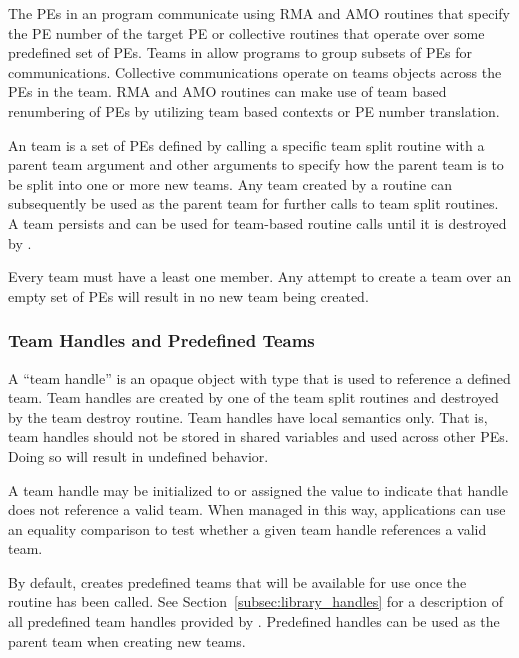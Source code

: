 The \acp{PE} in an \openshmem program communicate using
\ac{RMA} and \ac{AMO} routines that specify the \ac{PE} number of the target
\ac{PE} or collective routines that operate over some predefined
set of \acp{PE}. Teams in \openshmem allow programs to group subsets
of \acp{PE} for communications. Collective communications operate on
teams objects across the \acp{PE} in the team. \ac{RMA} and \ac{AMO} routines
can make use of team based renumbering of \acp{PE} by utilizing team
based contexts or \ac{PE} number translation.

An \openshmem team is a set of \acp{PE} defined by calling a specific team
split routine with a parent team argument and other arguments to
specify how the parent team is to be split into one or more new teams.
Any team created by a  routine can subsequently
be used as the parent team for further calls to team split routines.
A team persists and can be used for team-based routine calls
until it is destroyed by .

Every team must have a least one member. Any attempt to create a team over an
empty set of \acp{PE} will result in no new team being created.

\subsubsection*{Team Handles and Predefined Teams}

A ``team handle'' is an opaque object with type  that is used
to reference a defined team.  Team handles are created by one of the team split
routines and destroyed by the team destroy routine. Team handles have local
semantics only. That is, team handles should not be stored in shared variables
and used across other \acp{PE}. Doing so will result in undefined behavior.

A team handle may be initialized to or assigned the value 
to indicate that handle does not reference a valid team. When managed in this way,
applications can use an equality comparison to test whether a given team handle
references a valid team.

By default, \openshmem creates predefined teams that will be available
for use once the routine  has been called. See
Section~\ref{subsec:library_handles} for a description of all predefined team handles
provided by \openshmem. Predefined  handles can be used as
the parent team when creating new \openshmem teams.

